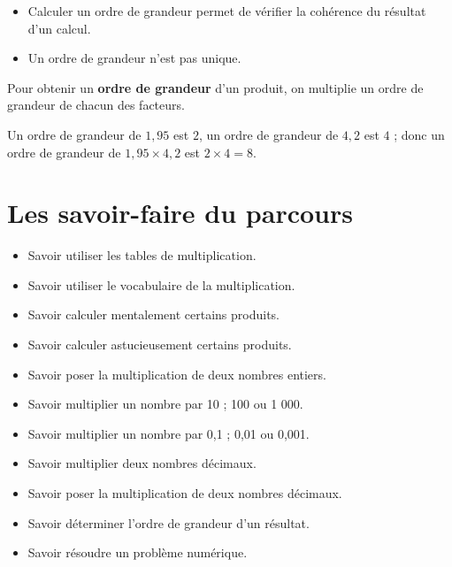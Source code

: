 \documentclass[a4paper,dvipsnames]{article}
\begin{document}
\begin{Rq}
\begin{itemize}
\item  Calculer un ordre de grandeur permet de vérifier la cohérence du résultat d'un calcul.
\item Un ordre de grandeur n'est pas unique.
\end{itemize}
\end{Rq}

\begin{Reg}
Pour obtenir un \textbf{ordre de grandeur} d'un produit, on multiplie un ordre de grandeur de chacun des facteurs.
\end{Reg} 

\begin{Ex}
Un ordre de grandeur de $1,95$ est $2$, un ordre de grandeur de $4,2$ est $4$ ; donc un ordre de grandeur de $1,95\times4,2$ est $2\times4=8$.
\end{Ex} 

\section{Les savoir-faire du parcours}

\begin{CpsCol}
\begin{itemize}
\item Savoir utiliser les tables de multiplication.
\item Savoir utiliser le vocabulaire de la multiplication.
\item Savoir calculer mentalement certains produits.
\item Savoir calculer astucieusement certains produits.
\item Savoir poser la multiplication de deux nombres entiers.
\item Savoir multiplier un nombre par 10 ; 100 ou 1 000.
\item Savoir multiplier un nombre par 0,1 ; 0,01 ou 0,001.
\item Savoir multiplier deux nombres décimaux.
\item Savoir poser la multiplication de deux nombres décimaux.
\item Savoir déterminer l'ordre de grandeur d'un résultat.
\item Savoir résoudre un problème numérique.
\end{itemize}
\end{CpsCol}
\end{document}
